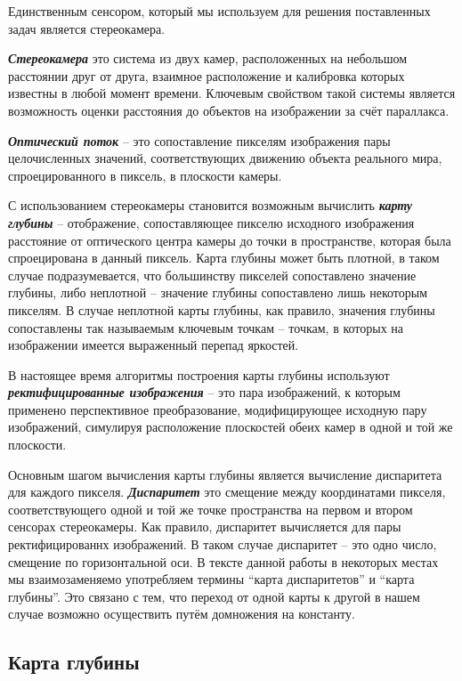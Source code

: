 \documentclass[aps,%
14pt,%
final,%
oneside,
onecolumn,%
musixtex, %
superscriptaddress,%
centertags]{extarticle} %
\begin{document}
Единственным сенсором, который мы используем для решения поставленных задач является стереокамера.

\textbf{\textit{Стереокамера}} это система из двух камер, расположенных на небольшом расстоянии друг от друга, взаимное расположение и калибровка которых известны в любой момент времени. Ключевым свойством такой системы является возможность оценки расстояния до объектов на изображении за счёт параллакса.

\textbf{\textit{Оптический поток}} -- это сопоставление пикселям изображения  пары целочисленных значений, соответствующих движению объекта реального мира, спроецированного в пиксель, в плоскости камеры.

С использованием стереокамеры становится возможным вычислить \textbf{\textit{карту глубины}} -- отображение, сопоставляющее пикселю исходного изображения расстояние от оптического центра камеры до точки в пространстве, которая была спроецирована в данный пиксель. Карта глубины может быть плотной, в таком случае подразумевается, что большинству пикселей сопоставлено значение глубины, либо неплотной -- значение глубины сопоставлено лишь некоторым пикселям. В случае неплотной карты глубины, как правило, значения глубины сопоставлены так называемым ключевым точкам -- точкам, в которых на изображении имеется выраженный перепад яркостей.

В настоящее время алгоритмы построения карты глубины используют \textbf{\textit{ректифицированные изображения}} -- это пара изображений, к которым применено перспективное преобразование, модифицирующее исходную пару изображений, симулируя расположение плоскостей обеих камер в одной и той же плоскости.

Основным шагом вычисления карты глубины является вычисление диспаритета для каждого пикселя. \textbf{\textit{Диспаритет}} это смещение между координатами пикселя, соответствующего одной и той же точке пространства на первом и втором сенсорах стереокамеры. Как правило, диспаритет вычисляется для пары ректифицированнх изображений. В таком случае диспаритет -- это одно число, смещение по горизонтальной оси. В тексте данной работы в некоторых местах мы взаимозаменяемо употребляем термины ``карта диспаритетов'' и ``карта глубины''. Это связано с тем, что переход от одной карты к другой в нашем случае возможно осуществить путём домножения на константу.

\subsection{Карта глубины}
\end{document}
